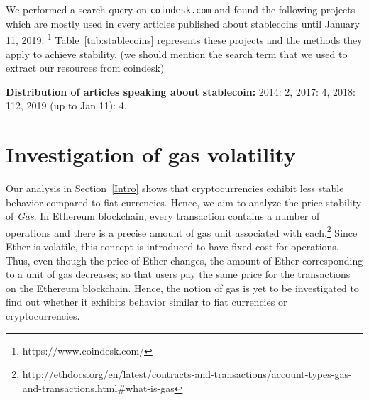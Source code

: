 We performed a search query on \texttt{coindesk.com} and found the following projects which are mostly used in every articles published about stablecoins until January 11, 2019. \footnote{https://www.coindesk.com/} Table~\ref{tab:stablecoins} represents these projects and the methods they apply to achieve stability. (we should mention the search term that we used to extract our resources from coindesk)


\textbf{Distribution of articles speaking about stablecoin:} 2014: 2, 2017: 4, 2018: 112, 2019 (up to Jan 11): 4.



\section{Investigation of gas volatility}


 \par
Our analysis in Section~\ref{Intro} shows that cryptocurrencies exhibit less stable behavior compared to fiat currencies. Hence, we aim to analyze the price stability of \emph{Gas}. In Ethereum blockchain, every transaction contains a number of operations and there is a precise amount of gas unit associated with each.\footnote{http://ethdocs.org/en/latest/contracts-and-transactions/account-types-gas-and-transactions.html\#what-is-gas} Since Ether is volatile, this concept is introduced to have fixed cost for operations. Thus, even though the price of Ether changes, the amount of Ether corresponding to a unit of gas decreases; so that users pay the same price for the transactions on the Ethereum blockchain. Hence, the notion of gas is yet to be investigated to find out whether it exhibits behavior similar to fiat currencies or cryptocurrencies.

